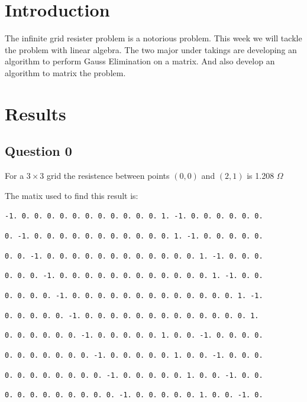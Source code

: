 \documentclass{article}
\author{\hwauthor}
\title{\hwtitle}
\date{\hwdate}
\begin{document}
\maketitle
\thispagestyle{fancy}

\section{Introduction}
 
The infinite grid resister problem is a notorious problem. This week we will tackle the problem with linear algebra. The two major under takings are developing an algorithm to perform Gauss Elimination on a matrix. And also develop an algorithm to matrix the problem.

\section{Results}

\subsection{Question 0}

For a $3\times3$ grid the resistence between points $(0,0)$ and  $(2,1)$ is 1.208 $\Omega$ 

The matix used to find this result is:

\texttt{-1.  0.  0.  0.  0.  0.  0.  0.  0.  0.  0.  0.  1. -1.  0.  0.  0.  0.  0.  0.}

\texttt{0. -1.  0.  0.  0.  0.  0.  0.  0.  0.  0.  0.  0.  1. -1.  0.  0.  0.  0.  0.}

\texttt{0.  0. -1.  0.  0.  0.  0.  0.  0.  0.  0.  0.  0.  0.  0.  1. -1.  0.  0.  0.}

 \texttt{0.  0.  0. -1.  0.  0.  0.  0.  0.  0.  0.  0.  0.  0.  0.  0.  1. -1.  0.  0.}

 \texttt{0.  0.  0.  0. -1.  0.  0.  0.  0.  0.  0.  0.  0.  0.  0.  0.  0.  0.  1. -1.}

 \texttt{0.  0.  0.  0.  0. -1.  0.  0.  0.  0.  0.  0.  0.  0.  0.  0.  0.  0.  0.  1.}

 \texttt{0.  0.  0.  0.  0.  0. -1.  0.  0.  0.  0.  0.  1.  0.  0. -1.  0.  0.  0.  0.}

 \texttt{0.  0.  0.  0.  0.  0.  0. -1.  0.  0.  0.  0.  0.  1.  0.  0. -1.  0.  0.  0.}

 \texttt{0.  0.  0.  0.  0.  0.  0.  0. -1.  0.  0.  0.  0.  0.  1.  0.  0. -1.  0.  0.}

 \texttt{0.  0.  0.  0.  0.  0.  0.  0.  0. -1.  0.  0.  0.  0.  0.  1.  0.  0. -1.  0.}
\end{document}
